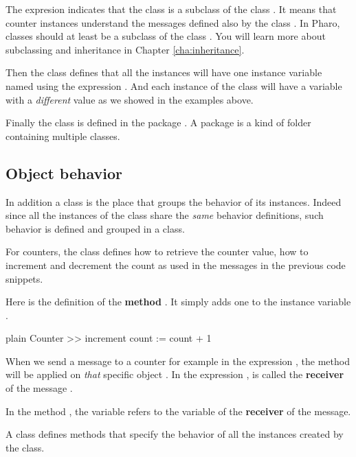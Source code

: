 \documentclass[10pt,twoside,english]{_support/latex/sbabook/sbabook}
\begin{document}
The expresion  indicates that the class  is a subclass of the class .
It means that counter instances understand the messages defined also by the class . In Pharo, classes should at least be a subclass of the class . You will learn more about subclassing and inheritance in Chapter \ref{cha:inheritance}.

Then the class  defines that all the instances will have one instance variable named  using the expression . And each instance of the class  will have a  variable with a \textit{different} value as we showed in the examples above.

Finally the class is defined in the package . A package is a kind of folder containing multiple classes. 
\subsection{Object behavior}
In addition a class is the place that groups the behavior of its instances. Indeed since all the instances of the class share the \textit{same} behavior definitions, such behavior is defined and grouped in a class.

For counters, the class defines how to retrieve the counter value, how to increment 
and decrement the count as used in the messages in the previous code snippets.

Here is the definition of the \textbf{method} . 
It simply adds one to the instance variable .

\begin{displaycode}{plain}
Counter >> increment
	count := count + 1
\end{displaycode}

When we send a message to a counter for example in the expression , 
the method  will be applied on \textit{that} specific object .
In the expression ,  is called the \textbf{receiver} of the message . 

In the method ,  the variable  refers to the variable of the \textbf{receiver} of the message. 

\begin{coffee}
A class defines methods that specify the behavior of all the instances created by the class.
\end{coffee}
\end{document}
